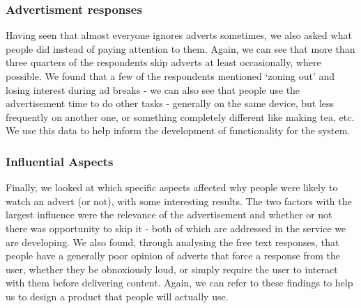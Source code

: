 \subsubsection{Advertisment responses}
Having seen that almost everyone ignores adverts sometimes, we also asked what people did instead of paying attention to them. Again, we can see that more than three quarters of the respondents skip adverts at least occasionally, where possible. We found that a few of the respondents mentioned `zoning out' and losing interest during ad breaks - we can also see that people use the advertisement time to do other tasks - generally on the same device, but less frequently on another one, or something completely different like making tea, etc. We use this data to help inform the development of functionality for the system.

\subsubsection{Influential Aspects}
Finally, we looked at which specific aspects affected why people were likely to watch an advert (or not), with some interesting results. The two factors with the largest influence were the relevance of the advertisement and whether or not there was opportunity to skip it - both of which are addressed in the service we are developing. We also found, through analysing the free text responses, that people have a generally poor opinion of adverts that force a response from the user, whether they be obnoxiously loud, or simply require the user to interact with them before delivering content. Again, we can refer to these findings to help us to design a product that people will actually use. 
